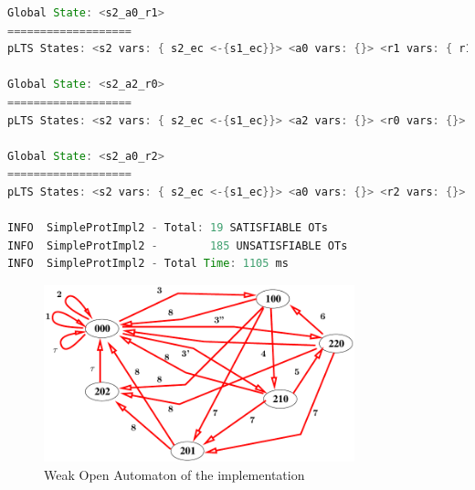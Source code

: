 \documentclass{lmcs}
\begin{document}
\begin{lstlisting}[basicstyle=\scriptsize\ttfamily, language=java, frame=single]
Global State: <s2_a0_r1>
===================
pLTS States: <s2 vars: { s2_ec <-{s1_ec}}> <a0 vars: {}> <r1 vars: { r1_ec <-{c} r1_msg <-{msg}}>

Global State: <s2_a2_r0>
===================
pLTS States: <s2 vars: { s2_ec <-{s1_ec}}> <a2 vars: {}> <r0 vars: {}>

Global State: <s2_a0_r2>
===================
pLTS States: <s2 vars: { s2_ec <-{s1_ec}}> <a0 vars: {}> <r2 vars: {}>

INFO  SimpleProtImpl2 - Total: 19 SATISFIABLE OTs
INFO  SimpleProtImpl2 -        185 UNSATISFIABLE OTs
INFO  SimpleProtImpl2 - Total Time: 1105 ms

\end{lstlisting}






\begin{figure}[h]
   \centerline{\includegraphics[width=9cm]{XFIG/SimpleProtImpl-WOA}}
  \caption{Weak Open Automaton of the implementation}
   \label{Appendix:SpecOA-partial}
\end{figure}
\end{document}
